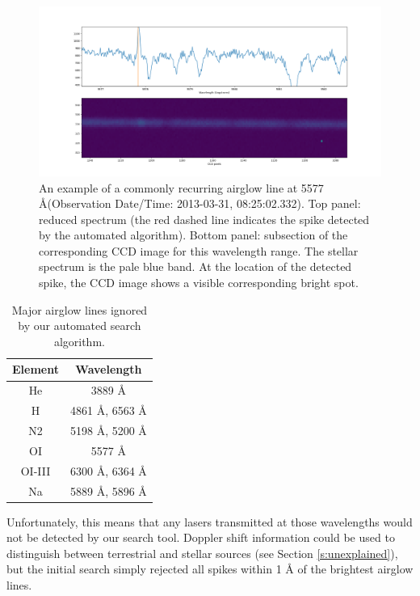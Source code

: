 \documentclass[linenumbers]{aastex631}
\begin{document}
\begin{figure}
    \centering
    \includegraphics[width=\textwidth]{airglowexample.png}
    \caption{An example of a commonly recurring airglow line at 5577 \AA (Observation Date/Time: 2013-03-31, 08:25:02.332). Top panel: reduced spectrum (the red dashed line indicates the spike detected by the automated algorithm).  Bottom panel: subsection of the corresponding CCD image for this wavelength range. The stellar spectrum is the pale blue band. At the location of the detected spike, the CCD image shows a visible corresponding bright spot.}
    \label{fig:airglowexample}
\end{figure}

\begin{table}
\begin{center}
\begin{tabular}{|c|c|} 
 \hline
 Element & Wavelength \\ 
 \hline
 He & 3889 \AA \\ 
 \hline
 H & 4861 \AA, 6563 \AA \\ 
 \hline
 N2 & 5198 \AA, 5200 \AA \\ 
 \hline
 OI & 5577 \AA \\
 \hline
 OI-III & 6300 \AA, 6364 \AA \\
 \hline
 Na & 5889 \AA , 5896 \AA \\
 \hline
 \end{tabular}
\end{center}
 \caption{Major airglow lines ignored by our automated search algorithm.}
 \label{table:AirglowWavelengths}
\end{table}

Unfortunately, this means that any lasers transmitted at those wavelengths would not be detected by our search tool.  Doppler shift information could be used to distinguish between terrestrial and stellar sources (see Section \ref{s:unexplained}), but the initial search simply rejected all spikes within 1 {\AA} of the brightest airglow lines.
\end{document}
